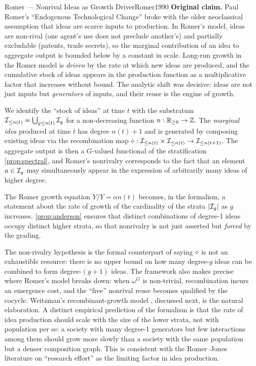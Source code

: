 \begin{zooentry}{Romer --- Nonrival Ideas as Growth Driver}{Romer1990}
\textbf{Original claim.} Paul Romer's ``Endogenous Technological
Change'' \cite{Romer1990} broke with the older neoclassical assumption
that ideas are scarce inputs to production. In Romer's model, ideas
are non-rival (one agent's use does not preclude another's) and
partially excludable (patents, trade secrets), so the marginal
contribution of an idea to aggregate output is bounded below by a
constant in scale. Long-run growth in the Romer model is
\emph{driven} by the rate at which new ideas are produced, and the
cumulative stock of ideas appears in the production function as a
multiplicative factor that increases without bound. The analytic shift
was decisive: ideas are not just inputs but \emph{generators} of
inputs, and their reuse is the engine of growth.

\formalclaim We identify the ``stock of ideas'' at time $t$ with the
substratum $\mathcal{I}_{\le n(t)} = \bigcup_{g\le n(t)}\mathcal{I}_g$ for a
non-decreasing function $n : \mathbb{R}_{\ge 0} \to \mathbb{Z}$. The
\emph{marginal idea} produced at time $t$ has degree $n(t)+1$ and is
generated by composing existing ideas via the
recombination map $\mathbin{\diamond} : \mathcal{I}_{\le n(t)} \times \mathcal{I}_{\le
n(t)} \to \mathcal{I}_{\le n(t+1)}$. The aggregate output is then a
$G$-valued functional of the stratification
\cref{prop:spectral}, and Romer's nonrivalry corresponds to the fact
that an element $a\in \mathcal{I}_g$ may simultaneously appear in the
expression of arbitrarily many ideas of higher degree.

\formalstatus The Romer growth equation $\dot Y / Y = \alpha \dot
n(t)$ becomes, in the formalism, a statement about the rate of
growth of the cardinality of the strata $|\mathcal{I}_g|$ as $g$ increases.
\cref{prop:anderson} ensures that distinct combinations of degree-1
ideas occupy distinct higher strata, so that nonrivalry is not just
asserted but \emph{forced} by the grading.

\litcomment The non-rivalry hypothesis is the formal counterpart of
saying $\mathbin{\diamond}$ is not an exhaustible resource: there is no upper
bound on how many degree-$g$ ideas can be combined to form
degree-$(g+1)$ ideas. The framework also makes precise where Romer's
model breaks down: when $\omega^G$ is non-trivial, recombination
incurs an emergence cost, and the ``free'' nonrival reuse becomes
qualified by the cocycle. Weitzman's recombinant-growth model
\cite{Weitzman1998}, discussed next, is the natural elaboration. A
distinct empirical prediction of the formalism is that the rate of
idea production should scale with the size of the lower strata, not
with population per se: a society with many degree-1 generators but
few interactions among them should grow more slowly than a society
with the same population but a denser composition graph. This is
consistent with the Romer--Jones literature \cite{Jones1995} on
``research effort'' as the limiting factor in idea production.
\end{zooentry}


